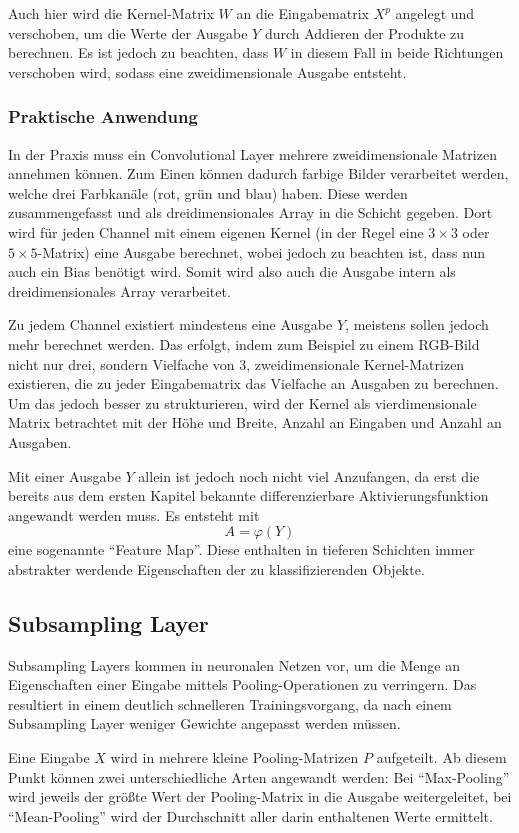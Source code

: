 \documentclass[12pt,a4]{article}
\begin{document}
Auch hier wird die Kernel-Matrix $W$ an die Eingabematrix $X^p$ angelegt und verschoben, um die Werte der Ausgabe $Y$ durch Addieren der Produkte zu berechnen. Es ist jedoch zu beachten, dass $W$ in diesem Fall in beide Richtungen verschoben wird, sodass eine zweidimensionale Ausgabe entsteht.

\subsubsection{Praktische Anwendung}
In der Praxis muss ein Convolutional Layer mehrere zweidimensionale Matrizen annehmen können. Zum Einen können dadurch farbige Bilder verarbeitet werden, welche drei Farbkanäle (rot, grün und blau) haben. Diese werden zusammengefasst und als dreidimensionales Array in die Schicht gegeben. Dort wird für jeden Channel mit einem eigenen Kernel (in der Regel eine $3 \times 3$ oder $5 \times 5$-Matrix) eine Ausgabe berechnet, wobei jedoch zu beachten ist, dass nun auch ein Bias benötigt wird. Somit wird also auch die Ausgabe intern als dreidimensionales Array verarbeitet. 

Zu jedem Channel existiert mindestens eine Ausgabe $Y$, meistens sollen jedoch mehr berechnet werden. Das erfolgt, indem zum Beispiel zu einem RGB-Bild nicht nur drei, sondern Vielfache von 3, zweidimensionale Kernel-Matrizen existieren, die zu jeder Eingabematrix das Vielfache an Ausgaben zu berechnen. Um das jedoch besser zu strukturieren, wird der Kernel als vierdimensionale Matrix betrachtet mit der Höhe und  Breite, Anzahl an Eingaben und Anzahl an Ausgaben.

Mit einer Ausgabe $Y$ allein ist jedoch noch nicht viel Anzufangen, da erst die bereits aus dem ersten Kapitel bekannte differenzierbare Aktivierungsfunktion angewandt werden muss. Es entsteht mit 
\[
A = \varphi (Y)
\]
eine sogenannte \enquote{Feature Map}. Diese enthalten in tieferen Schichten immer abstrakter werdende Eigenschaften der zu klassifizierenden Objekte.

\subsection{Subsampling Layer}
Subsampling Layers kommen in neuronalen Netzen vor, um die Menge an Eigenschaften einer Eingabe mittels Pooling-Operationen zu verringern. Das resultiert in einem deutlich schnelleren Trainingsvorgang, da nach einem Subsampling Layer weniger Gewichte angepasst werden müssen.

Eine Eingabe $X$ wird in mehrere kleine Pooling-Matrizen $P$ aufgeteilt. Ab diesem Punkt können zwei unterschiedliche Arten angewandt werden: Bei \enquote{Max-Pooling} wird jeweils der größte Wert der Pooling-Matrix in die Ausgabe weitergeleitet, bei \enquote{Mean-Pooling} wird der Durchschnitt aller darin enthaltenen Werte ermittelt.
\end{document}
